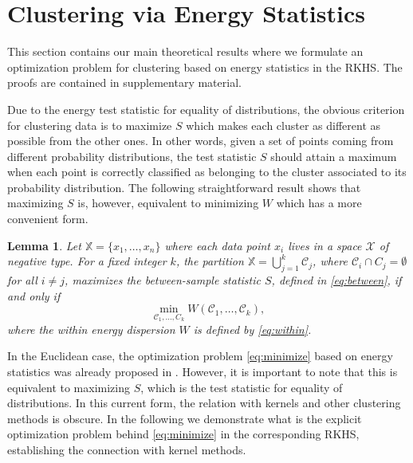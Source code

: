 \documentclass[twoside]{article}
\newtheorem{lemma}[theorem]{Lemma}
\newcommand\C{{\mathcal{C}}}
\begin{document}
\section{Clustering via Energy Statistics}
\label{sec:clustering_theory}

This section contains our main theoretical results where 
we formulate an optimization problem for clustering 
based on energy statistics in the RKHS.
The proofs are contained in supplementary material.

Due to the energy test statistic for equality of distributions,
the obvious
criterion for clustering data is to 
maximize $S$ which makes 
each cluster as different
as possible from the other ones.
In other words, given a set of points coming from different probability
distributions, the test statistic $S$ should attain a maximum when 
each point is correctly
classified as belonging to the cluster associated to its probability
distribution.
The following 
straightforward result
shows that maximizing $S$ is, however, equivalent to minimizing
$W$ which has a more convenient form.

\begin{lemma}
\label{th:minimize}
Let $\mathbb{X} = \{x_1,\dotsc,x_n\}$ where each data point
$x_i$ lives in a space $\mathcal{X}$ of negative type. 
For a fixed integer $k$,
the partition
$\mathbb{X} = \bigcup_{j=1}^k \C_j$, where $\C_i \cap C_j = \emptyset$ for
all $i\ne j$, maximizes the between-sample statistic $S$, defined
in \eqref{eq:between}, if and only if
\begin{equation}
\label{eq:minimize}
\min_{\C_1,\dotsc,C_k  } W(
\C_1, \dotsc, \C_k),
\end{equation}
where the within energy dispersion $W$ is defined by \eqref{eq:within}.
\end{lemma}

In the Euclidean case, the optimization problem \eqref{eq:minimize} based on
energy statistics was already proposed in \citep{Kgroups}. However, it is
important to note that this is equivalent to maximizing $S$,
which is the test statistic for equality of distributions. In this current
form, the relation with kernels and other clustering methods is obscure.
In the following we demonstrate what is the explicit optimization problem behind 
\eqref{eq:minimize} in the corresponding RKHS, 
establishing the connection with kernel methods.
\end{document}
